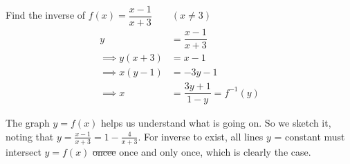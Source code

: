 \documentclass[twoside]{scrartcl}
\newcommand{\vasymptote}[2][]{
    \draw [densely dashed,#1] ({rel axis cs:0,0} -| {axis cs:#2,0}) -- ({rel axis cs:0,1} -| {axis cs:#2,0});
}
\begin{document}
\begin{example} Find the inverse of $f(x) = \dfrac{x-1}{x+3} \qquad (x \neq 3)$
\[
\begin{aligned}
  y &= \dfrac{x-1}{x+3}\\[0.2cm]
  \implies y(x+3) &= x-1\\
  \implies x(y-1) &= -3y-1 \\[0.2cm]
  \implies x &= \dfrac{3y+1}{1-y} = f^{-1}(y)
\end{aligned}
\]



\begin{center}
	

\end{center}
The graph $y = f(x)$ helps us understand what is going on. So we sketch it, noting that $y = \frac{x-1}{x+3} = 1 - \frac{4}{x+3}$. For inverse to exist, all lines $y$ = constant must intersect $y = f(x)$ \sout{oncee} once and only once, which is clearly the case.



\end{example}\vspace*{5pt}
\end{document}
